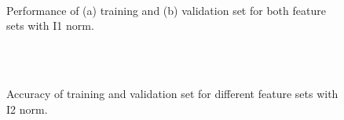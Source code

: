 \documentclass[11pt]{article}
\begin{document}
\begin{figure}[!h]
  \centering 
	\\%
  \caption{Performance of (a) training and (b) validation set for both feature sets with I1 norm.}
  \label{fig:I1_bogram}
\end{figure}

\begin{figure}[!h]
  \centering 
	\\%
	\\ %
  \caption{Accuracy of training and validation set for different feature sets with I2 norm.}
  \label{fig:I2_accuracy}
\end{figure}
\end{document}
